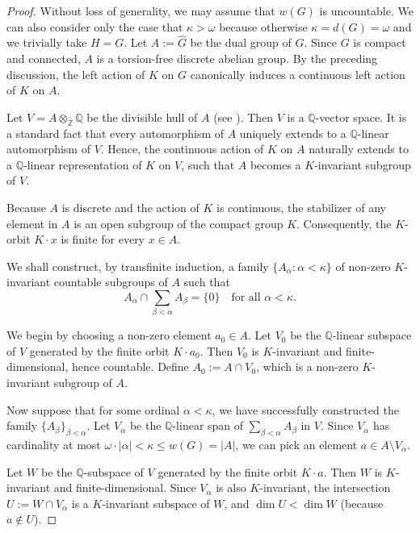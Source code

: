 \documentclass[12pt]{amsart}
\theoremstyle{definition}
\numberwithin{equation}{section}
\theoremstyle{remark}
\begin{document}
\begin{proof}
Without loss of generality, we may assume that $w(G)$ is uncountable. We can also consider only the case that $\kappa>\omega$ because otherwise $\kappa=d(G)=\omega$ and we trivially take $H=G$.  Let $A := \widehat{G}$ be the dual group of $G$. Since $G$ is compact and connected, $A$ is a torsion-free discrete abelian group. By the preceding discussion, the left action of $K$ on $G$ canonically induces a continuous left action of $K$ on $A$. 

Let $V=A\otimes_{\mathbb{Z}}\mathbb{Q}$ be the divisible hull of $A$ (see \cite[Sec. 24]{Fuc}). Then $V$ is a $\mathbb{Q}$-vector space. It is a standard fact that every automorphism of $A$ uniquely extends to a $\mathbb{Q}$-linear automorphism of $V$. Hence, the continuous action of $K$ on $A$ naturally extends to a $\mathbb{Q}$-linear representation of $K$ on $V$, such that $A$ becomes a $K$-invariant subgroup of $V$.

Because $A$ is discrete and the action of $K$ is continuous, the stabilizer of any element in $A$ is an open subgroup of the compact group $K$. Consequently, the $K$-orbit $K \cdot x$ is finite for every $x \in A$.

We shall construct, by transfinite induction, a family $\{A_\alpha : \alpha < \kappa\}$ of non-zero $K$-invariant countable subgroups of $A$ such that
\[ A_\alpha \cap \sum_{\beta < \alpha} A_\beta = \{0\} \quad \text{for all } \alpha < \kappa. \]

We begin by choosing a non-zero element $a_0 \in A$. Let $V_0$ be the $\mathbb{Q}$-linear subspace of $V$ generated by the finite orbit $K \cdot a_0$. Then $V_0$ is $K$-invariant and finite-dimensional, hence countable. Define $A_0 := A \cap V_0$, which is a non-zero $K$-invariant subgroup of $A$.

Now suppose that for some ordinal $\alpha < \kappa$, we have successfully constructed the family $\{A_\beta\}_{\beta < \alpha}$. Let $V_\alpha$ be the $\mathbb{Q}$-linear span of $\sum_{\beta < \alpha} A_\beta$ in $V$. Since $V_\alpha$ has cardinality at most $\omega \cdot |\alpha| < \kappa\leq w(G) = |A|$, we can pick an element $a \in A \setminus V_\alpha$.

Let $W$ be the $\mathbb{Q}$-subspace of $V$ generated by the finite orbit $K \cdot a$. Then $W$ is $K$-invariant and finite-dimensional. Since $V_\alpha$ is also $K$-invariant, the intersection $U := W \cap V_\alpha$ is a $K$-invariant subspace of $W$, and $\dim U < \dim W$ (because $a \notin U$).


\end{proof}
\end{document}
